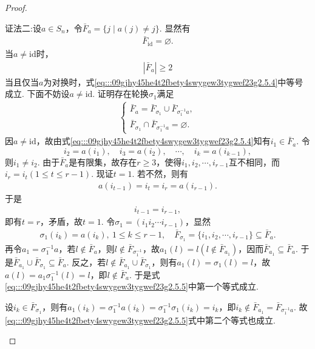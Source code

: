 \documentclass[../../main.tex]{subfiles}%
\begin{document}
\begin{proof}
\begin{enumerate}[(1)]
{\color{blue}证法二:}设$a \in S_n$，令$\bar{F}_a = \{j \mid a(j) \neq j\}$. 显然有
\begin{align}
\bar{F}_{\text{id}} = \varnothing. \label{eq:::09gjhy45he4t2fbety4swygew3tygwef23g2.5.3}
\end{align}
当$a \neq \text{id}$时，
\begin{align}
|\bar{F}_a| \geqslant 2 \label{eq:::09gjhy45he4t2fbety4swygew3tygwef23g2.5.4}
\end{align}
当且仅当$a$为对换时，式\eqref{eq:::09gjhy45he4t2fbety4swygew3tygwef23g2.5.4}中等号成立. 下面不妨设$a \neq \text{id}$. 证明存在轮换$\sigma_1$满足
\begin{align}
\begin{cases}
\bar{F}_a = \bar{F}_{\sigma_1} \cup \bar{F}_{\sigma_1^{-1} a}, \\
\bar{F}_{\sigma_1} \cap \bar{F}_{\sigma_1^{-1} a} = \varnothing.
\end{cases} \label{eq:::09gjhy45he4t2fbety4swygew3tygwef23g2.5.5}
\end{align}
因$a \neq \text{id}$，故由式\eqref{eq:::09gjhy45he4t2fbety4swygew3tygwef23g2.5.4}知有$i_1 \in \bar{F}_a$. 令
$$i_2 = a(i_1), \quad i_3 = a(i_2), \quad \cdots, \quad i_k = a(i_{k-1}),$$
则$i_1\neq i_2.$
由于$\bar{F}_a$是有限集，故存在$r\geqslant 3$，使得$i_1, i_2, \cdots, i_{r-1}$互不相同，而$i_r = i_t(1 \leqslant t \leqslant r - 1)$. 现证$t = 1$. 若不然，则有
\begin{align*}
a(i_{t-1}) = i_t = i_r = a(i_{r-1}).
\end{align*}
于是
\begin{align*}
i_{t-1} = i_{r-1},
\end{align*}
即有$t = r$，矛盾，故$t = 1$. 令$\sigma_1 = (i_1 i_2 \cdots i_{r-1})$，显然
\begin{align*}
\sigma_1(i_k) = a(i_k),\ 1 \leqslant k \leqslant r-1, \quad \bar{F}_{\sigma_1} = \{i_1, i_2, \cdots, i_{r-1}\} \subseteq \bar{F}_a.
\end{align*}
再令$a_1 = \sigma_1^{-1} a$，若$l \notin \bar{F}_a$，则$l \notin \bar{F}_{\sigma_1^{-1}}$，故$a_1(l) = l(l \notin \bar{F}_{a_1})$，因而$\bar{F}_{a_1} \subseteq \bar{F}_a$. 于是$\bar{F}_{a_1} \cup \bar{F}_{\sigma_1} \subseteq \bar{F}_a$. 反之，若$l \notin \bar{F}_{a_1} \cup \bar{F}_{\sigma_1}$，则有$a_1(l) = \sigma_1(l) = l$，故$a(l) =a_1\sigma_1^{-1}(l)= l$，即$l \notin \bar{F}_a$. 于是式\eqref{eq:::09gjhy45he4t2fbety4swygew3tygwef23g2.5.5}中第一个等式成立.

设$i_k \in \bar{F}_{\sigma_1}$，则有$a_1(i_k) = \sigma_1^{-1} a(i_k) = \sigma_1^{-1} \sigma_1(i_k) = i_k$，即$i_k \notin \bar{F}_{a_1}= \bar{F}_{\sigma_1^{-1}a}$. 故\eqref{eq:::09gjhy45he4t2fbety4swygew3tygwef23g2.5.5}式中第二个等式也成立. 


\end{enumerate}
\end{proof}
\end{document}
